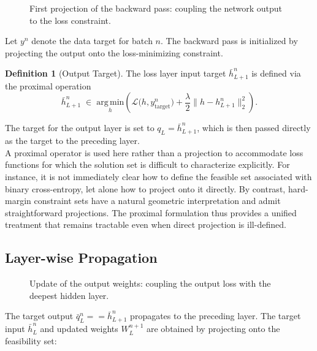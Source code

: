 \documentclass{article}
\theoremstyle{plain}
\theoremstyle{definition}
\newtheorem{definition}[theorem]{Definition}
\theoremstyle{remark}
\begin{document}
\begin{figure}[htbp]
\centering
\resizebox{\textwidth}{!}{%

}
\caption{First projection of the backward pass: coupling the network output to the loss constraint.}
\label{fig:init_back_prop}
\end{figure}

Let $y^{n}$ denote the data target for batch $n$. The backward pass is initialized by projecting the output onto the loss-minimizing constraint.

\begin{definition}[Output Target]
\label{def:output-target}
The loss layer input target $\bar{h}_{L+1}^n$ is defined via the proximal operation
\begin{equation}
\bar{h}_{L+1}^n \;\in\; \underset{h}{\mathrm{arg\,min}} \left( \mathcal{L}\bigl(h, y_{\mathrm{target}}^{n}\bigr) + \frac{\lambda}{2} \bigl\|h - h_{L+1}^{n}\bigr\|_2^2 \right).
\end{equation}
\end{definition}
The target for the output layer is set to $q_{L} = \bar{h}_{L+1}^n$, which is then passed directly as the target to the preceding layer.
\\
A proximal operator is used here rather than a projection to accommodate loss functions for which the solution set is difficult to characterize explicitly. For instance, it is not immediately clear how to define the feasible set associated with binary cross-entropy, let alone how to project onto it directly. By contrast, hard-margin constraint sets have a natural geometric interpretation and admit straightforward projections. The proximal formulation thus provides a unified treatment that remains tractable even when direct projection is ill-defined.

\subsection{Layer-wise Propagation}

\begin{figure}[htbp]
\centering
\resizebox{\textwidth}{!}{%

}
\caption{Update of the output weights: coupling the output loss with the deepest hidden layer.}
\label{fig:next_back_prop}
\end{figure}

The target output $\bar{q}_L^{n} ==  \bar{h}_{L+1}^n$ propagates to the preceding layer. The target input $\bar{h}_{L}^{n}$ and updated weights $W_L^{n+1}$ are obtained by projecting onto the feasibility set:
\end{document}
